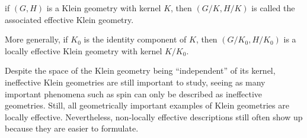 \begin{defn}
    if $(G,H)$ is a Klein geometry with kernel $K$, then $(G\slash K,H\slash K)$ is called the associated effective Klein geometry.
\end{defn}

More generally, if $K_0$ is the identity component of $K$, then $(G\slash K_0,H\slash K_0)$ is a locally effective Klein geometry with kernel $K\slash K_0$.

\begin{rem}
    Despite the space of the Klein geometry being ``independent'' of its kernel, ineffective Klein geometries are still important to study, seeing as many important phenomena such as spin can only be described as ineffective geometries. Still, all geometrically important examples of Klein geometries are locally effective. Nevertheless, non-locally effective descriptions still often show up because they are easier to formulate. 
\end{rem}






